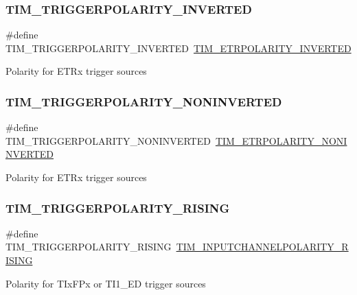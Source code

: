 \subsubsection{\texorpdfstring{TIM\_TRIGGERPOLARITY\_INVERTED}{TIM\_TRIGGERPOLARITY\_INVERTED}}
{\footnotesize\ttfamily \#define T\+I\+M\+\_\+\+T\+R\+I\+G\+G\+E\+R\+P\+O\+L\+A\+R\+I\+T\+Y\+\_\+\+I\+N\+V\+E\+R\+T\+ED~\mbox{\hyperlink{group___t_i_m___e_t_r___polarity_ga42652ff688f0042659f8304ae08abfa6}{T\+I\+M\+\_\+\+E\+T\+R\+P\+O\+L\+A\+R\+I\+T\+Y\+\_\+\+I\+N\+V\+E\+R\+T\+ED}}}

Polarity for E\+T\+Rx trigger sources \mbox{\label{group___t_i_m___trigger___polarity_gad985881cdfddb63dfc52e6aaca776ff6}} 
\subsubsection{\texorpdfstring{TIM\_TRIGGERPOLARITY\_NONINVERTED}{TIM\_TRIGGERPOLARITY\_NONINVERTED}}
{\footnotesize\ttfamily \#define T\+I\+M\+\_\+\+T\+R\+I\+G\+G\+E\+R\+P\+O\+L\+A\+R\+I\+T\+Y\+\_\+\+N\+O\+N\+I\+N\+V\+E\+R\+T\+ED~\mbox{\hyperlink{group___t_i_m___e_t_r___polarity_ga7fa7c43245b25564414b2e191d5d8b14}{T\+I\+M\+\_\+\+E\+T\+R\+P\+O\+L\+A\+R\+I\+T\+Y\+\_\+\+N\+O\+N\+I\+N\+V\+E\+R\+T\+ED}}}

Polarity for E\+T\+Rx trigger sources \mbox{\label{group___t_i_m___trigger___polarity_ga64b521aa367d745ec00a763449634ace}} 
\subsubsection{\texorpdfstring{TIM\_TRIGGERPOLARITY\_RISING}{TIM\_TRIGGERPOLARITY\_RISING}}
{\footnotesize\ttfamily \#define T\+I\+M\+\_\+\+T\+R\+I\+G\+G\+E\+R\+P\+O\+L\+A\+R\+I\+T\+Y\+\_\+\+R\+I\+S\+I\+NG~\mbox{\hyperlink{group___t_i_m___input___channel___polarity_ga4f4cede88a4ad4b33e81f2567e9bb08f}{T\+I\+M\+\_\+\+I\+N\+P\+U\+T\+C\+H\+A\+N\+N\+E\+L\+P\+O\+L\+A\+R\+I\+T\+Y\+\_\+\+R\+I\+S\+I\+NG}}}

Polarity for T\+Ix\+F\+Px or T\+I1\+\_\+\+ED trigger sources 
